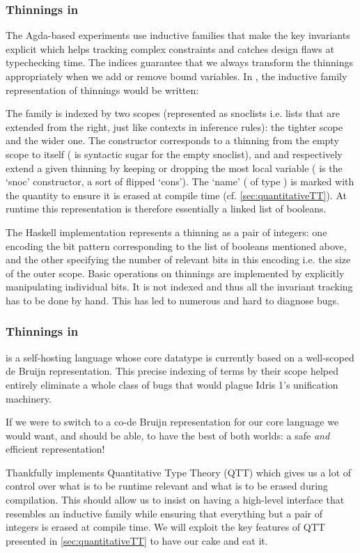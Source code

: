 \subsubsection{Thinnings in \typos}

The Agda-based experiments use inductive families that make the key invariants
explicit which helps tracking complex constraints and catches design flaws at
typechecking time.
%
The indices guarantee that we always transform the thinnings appropriately when
we add or remove bound variables. In \idris{}, the inductive family representation
of thinnings would be written:

%
The  family is indexed by two scopes (represented as snoclists
i.e. lists that are extended from the right, just like contexts in inference rules):
 the tighter scope and  the wider one.
%
The  constructor corresponds to a thinning from the empty scope to
itself (\IdrisData{[<]} is \idris{} syntactic sugar for the empty snoclist),
and  and  respectively extend a given thinning
by keeping or dropping the most local variable (\IdrisData{:<} is the `snoc'
constructor, a sort of flipped `cons').
%
The `name' ( of type ) is marked with the quantity
 to ensure it is erased at compile time (cf. \cref{sec:quantitativeTT}).
%
At runtime this representation is therefore essentially a linked list of booleans.

The Haskell implementation represents a thinning as a pair of integers: one encoding
the bit pattern corresponding to the list of booleans mentioned above, and the other
specifying the number of relevant bits in this encoding i.e. the size of the outer scope.
%
Basic operations on thinnings are implemented by explicitly manipulating individual bits.
%
It is not indexed and thus all the invariant tracking has to be done by hand.
This has led to numerous and hard to diagnose bugs.

\subsubsection{Thinnings in \idris}

\idris{} is a self-hosting language whose core datatype is currently based on
a well-scoped de Bruijn representation.
%
This precise indexing of terms by their scope helped entirely eliminate a whole
class of bugs that would plague Idris 1's unification machinery.

If we were to switch to a co-de Bruijn representation for our core language we
would want, and should be able, to have the best of both worlds:
a safe \emph{and} efficient representation!

Thankfully \idris{} implements Quantitative Type Theory (QTT) which gives us a
lot of control over what is to be runtime relevant and what is to be erased
during compilation.
%
This should allow us to insist on having a high-level interface that resembles
an inductive family while ensuring that everything but a pair of integers is erased
at compile time.
%
We will exploit the key features of QTT presented in \cref{sec:quantitativeTT}
to have our cake and eat it.
